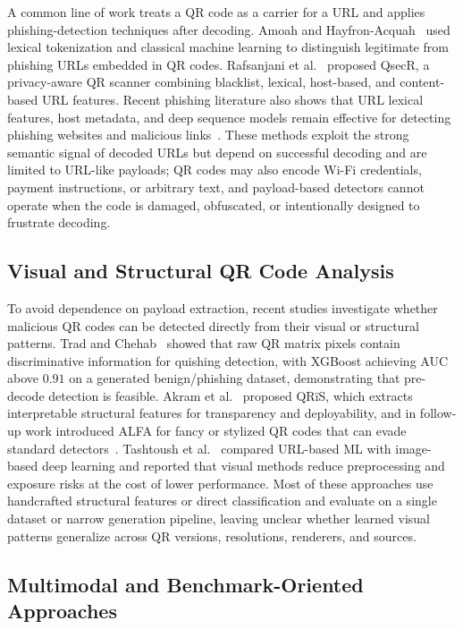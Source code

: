 \documentclass[conference]{IEEEtran}
\begin{document}
A common line of work treats a QR code as a carrier for a URL and applies phishing-detection techniques after decoding. Amoah and Hayfron-Acquah~\cite{amoah2022qr} used lexical tokenization and classical machine learning to distinguish legitimate from phishing URLs embedded in QR codes. Rafsanjani et al.~\cite{rafsanjani2023qsecr} proposed QsecR, a privacy-aware QR scanner combining blacklist, lexical, host-based, and content-based URL features. Recent phishing literature also shows that URL lexical features, host metadata, and deep sequence models remain effective for detecting phishing websites and malicious links~\cite{jayaprakash2024heuristic}. These methods exploit the strong semantic signal of decoded URLs but depend on successful decoding and are limited to URL-like payloads; QR codes may also encode Wi-Fi credentials, payment instructions, or arbitrary text, and payload-based detectors cannot operate when the code is damaged, obfuscated, or intentionally designed to frustrate decoding.

\subsection{Visual and Structural QR Code Analysis}

To avoid dependence on payload extraction, recent studies investigate whether malicious QR codes can be detected directly from their visual or structural patterns. Trad and Chehab~\cite{trad2025detecting} showed that raw QR matrix pixels contain discriminative information for quishing detection, with XGBoost achieving AUC above $0.91$ on a generated benign/phishing dataset, demonstrating that pre-decode detection is feasible. Akram et al.~\cite{akram2025qr} proposed QR\"iS, which extracts interpretable structural features for transparency and deployability, and in follow-up work introduced ALFA for fancy or stylized QR codes that can evade standard detectors~\cite{wahid2026alfa}. Tashtoush et al.~\cite{tashtoush2025comparing} compared URL-based ML with image-based deep learning and reported that visual methods reduce preprocessing and exposure risks at the cost of lower performance. Most of these approaches use handcrafted structural features or direct classification and evaluate on a single dataset or narrow generation pipeline, leaving unclear whether learned visual patterns generalize across QR versions, resolutions, renderers, and sources.

\subsection{Multimodal and Benchmark-Oriented Approaches}
\end{document}
